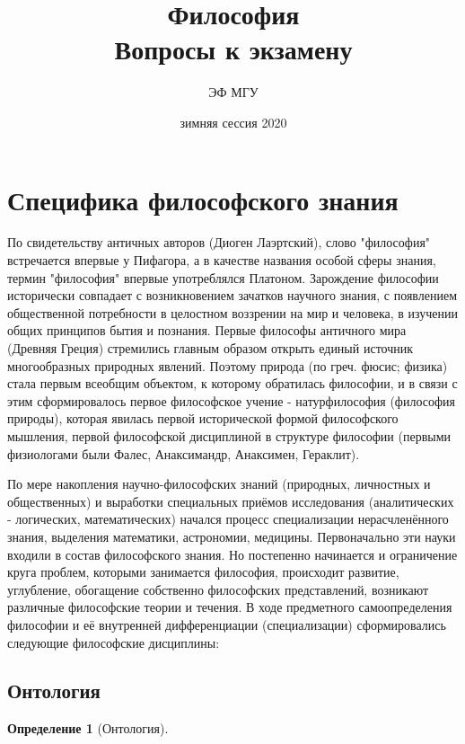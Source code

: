 \documentclass[a4paper, 12pt]{article}
\title{Философия \\ Вопросы к экзамену}
\author{ЭФ МГУ}
\date{зимняя сессия 2020}
\theoremstyle{plain} %
\newtheorem{definition}{Определение}
\theoremstyle{definition} %
\theoremstyle{remark} %
\begin{document}
\maketitle

\section{Специфика философского знания}
По свидетельству античных авторов (Диоген Лаэртский), слово "философия" встречается впервые у Пифагора, а в качестве названия особой сферы знания, термин "философия" впервые употреблялся Платоном. Зарождение философии исторически совпадает с возникновением зачатков научного знания, с появлением общественной потребности в целостном воззрении на мир и человека, в изучении общих принципов бытия и познания. Первые философы античного мира (Древняя Греция) стремились главным образом открыть единый источник многообразных природных явлений. Поэтому природа (по греч. фюсис; физика) стала первым всеобщим объектом, к которому обратилась философии, и в связи с этим сформировалось первое философское учение - натурфилософия (философия природы), которая явилась первой исторической формой философского мышления, первой философской дисциплиной в структуре философии (первыми физиологами были Фалес, Анаксимандр, Анаксимен, Гераклит).

\vspace{1em}
По мере накопления научно-философских знаний (природных, личностных и общественных) и выработки специальных приёмов исследования (аналитических - логических, математических) начался процесс специализации нерасчленённого знания, выделения математики, астрономии, медицины. Первоначально эти науки входили в состав философского знания. Но постепенно начинается и ограничение круга проблем, которыми занимается философия, происходит развитие, углубление, обогащение собственно философских представлений, возникают различные философские теории и течения. В ходе предметного самоопределения философии и её внутренней дифференциации (специализации) сформировались следующие философские дисциплины:
\subsection{Онтология}

\begin{definition}[Онтология]

\end{definition}
\end{document}
